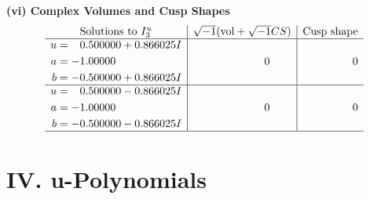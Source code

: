 \documentclass[1p]{elsarticle_modified}
\theoremstyle{definition}
\newcommand{\I}{\sqrt{-1}}
\begin{document}
\newpage\flushleft \textbf{(vi) Complex Volumes and Cusp Shapes}
$$\begin{array}{c|c|c}  
\text{Solutions to }I^u_{3}& \I (\text{vol} + \sqrt{-1}CS) & \text{Cusp shape}\\
 \hline 
\begin{aligned}
u &= \phantom{-}0.500000 + 0.866025 I \\
a &= -1.00000\phantom{ +0.000000I} \\
b &= -0.500000 + 0.866025 I\end{aligned}
 & \phantom{-0.000000 } 0 & \phantom{-0.000000 } 0 \\ \hline\begin{aligned}
u &= \phantom{-}0.500000 - 0.866025 I \\
a &= -1.00000\phantom{ +0.000000I} \\
b &= -0.500000 - 0.866025 I\end{aligned}
 & \phantom{-0.000000 } 0 & \phantom{-0.000000 } 0\\
 \hline 
 \end{array}$$\newpage
\newpage\renewcommand{\arraystretch}{1}
\centering \section*{ IV. u-Polynomials}
\end{document}

